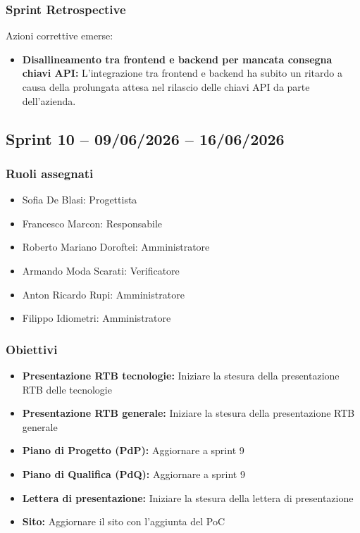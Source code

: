 \subsubsection{Sprint Retrospective}
Azioni correttive emerse:
\begin{itemize}
    \item \textbf{Disallineamento tra frontend e backend per mancata consegna chiavi API:} L'integrazione tra frontend e backend ha subito un ritardo a causa della prolungata attesa nel rilascio delle chiavi API da parte dell'azienda.
\end{itemize}

\subsection{Sprint 10 -- 09/06/2026 -- 16/06/2026}
\label{sec:sprint10}

\subsubsection{Ruoli assegnati}
\begin{itemize}
    \item Sofia De Blasi: Progettista
    \item Francesco Marcon: Responsabile
    \item Roberto Mariano Doroftei: Amministratore
    \item Armando Moda Scarati: Verificatore
    \item Anton Ricardo Rupi: Amministratore
    \item Filippo Idiometri: Amministratore
\end{itemize}

\subsubsection{Obiettivi}
\begin{itemize}
    \item \textbf{Presentazione RTB tecnologie:} Iniziare la stesura della presentazione RTB delle tecnologie
    \item \textbf{Presentazione RTB generale:} Iniziare la stesura della presentazione RTB generale
    \item \textbf{Piano di Progetto (PdP):} Aggiornare a sprint 9
    \item \textbf{Piano di Qualifica (PdQ):} Aggiornare a sprint 9
    \item \textbf{Lettera di presentazione:} Iniziare la stesura della lettera di presentazione
    \item \textbf{Sito:} Aggiornare il sito con l'aggiunta del PoC
\end{itemize}

